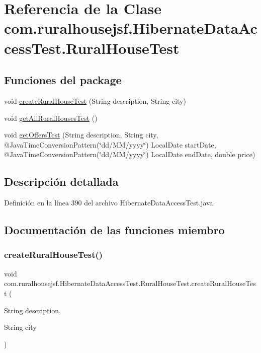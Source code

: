\hypertarget{a00284}{}\section{Referencia de la Clase com.\+ruralhousejsf.\+Hibernate\+Data\+Access\+Test.\+Rural\+House\+Test}
\label{a00284}
\subsection*{Funciones del \textquotesingle{}package\textquotesingle{}}
\begin{DoxyCompactItemize}
\item 
void \mbox{\hyperlink{a00284_a34ac80f29a8ab5743e37e7f2e78db5e8}{create\+Rural\+House\+Test}} (String description, String city)
\item 
void \mbox{\hyperlink{a00284_abe3f39b2ef888c3f2b16d399c3d01f66}{get\+All\+Rural\+Houses\+Test}} ()
\item 
void \mbox{\hyperlink{a00284_a1f307f98016263fa520eefc8520ed5d2}{get\+Offers\+Test}} (String description, String city, @Java\+Time\+Conversion\+Pattern(\char`\"{}dd/MM/yyyy\char`\"{}) Local\+Date start\+Date, @Java\+Time\+Conversion\+Pattern(\char`\"{}dd/MM/yyyy\char`\"{}) Local\+Date end\+Date, double price)
\end{DoxyCompactItemize}


\subsection{Descripción detallada}


Definición en la línea 390 del archivo Hibernate\+Data\+Access\+Test.\+java.



\subsection{Documentación de las funciones miembro}
\mbox{\label{a00284_a34ac80f29a8ab5743e37e7f2e78db5e8}} 
\subsubsection{\texorpdfstring{createRuralHouseTest()}{createRuralHouseTest()}}
{\footnotesize\ttfamily void com.\+ruralhousejsf.\+Hibernate\+Data\+Access\+Test.\+Rural\+House\+Test.\+create\+Rural\+House\+Test (\begin{DoxyParamCaption}\item[{String}]{description,  }\item[{String}]{city }\end{DoxyParamCaption})\hspace{0.3cm}{\ttfamily [package]}}



